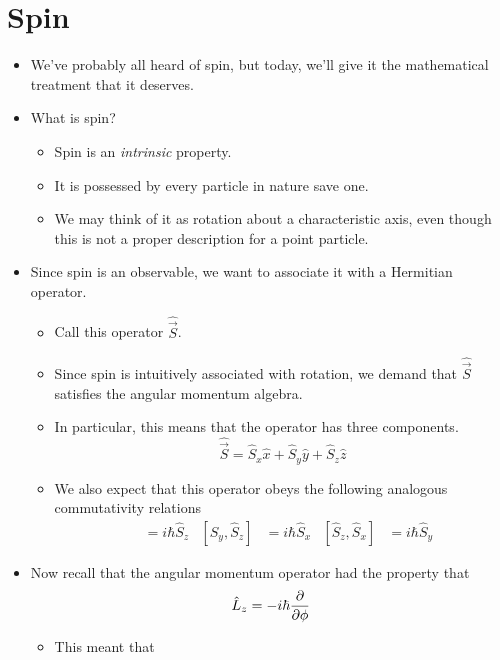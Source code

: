 \documentclass[../notes.tex]{subfiles}
\begin{document}
\section{Spin}
\begin{itemize}
    \item {}We've probably all heard of spin, but today, we'll give it the mathematical treatment that it deserves.
    \item What is spin?
    \begin{itemize}
        \item Spin is an \emph{intrinsic} property.
        \item It is possessed by every particle in nature save one.
        \item We may think of it as rotation about a characteristic axis, even though this is not a proper description for a point particle.
    \end{itemize}
    \item Since spin is an observable, we want to associate it with a Hermitian operator.
    \begin{itemize}
        \item Call this operator $\hat{\vec{S}}$.
        \item Since spin is intuitively associated with rotation, we demand that $\hat{\vec{S}}$ satisfies the angular momentum algebra.
        \item In particular, this means that the operator has three components.
        \begin{equation*}
            \hat{\vec{S}} = \hat{S}_x\hat{x}+\hat{S}_y\hat{y}+\hat{S}_z\hat{z}
        \end{equation*}
        \item We also expect that this operator obeys the following analogous commutativity relations
        \begin{align*}
            [\hat{S}_x,\hat{S}_y] &= i\hbar\hat{S}_z&
            [\hat{S}_y,\hat{S}_z] &= i\hbar\hat{S}_x&
            [\hat{S}_z,\hat{S}_x] &= i\hbar\hat{S}_y
        \end{align*}
    \end{itemize}
    \item Now recall that the angular momentum operator had the property that
    \begin{equation*}
        \hat{L}_z = -i\hbar\pdv{\phi}
    \end{equation*}
    \begin{itemize}
        \item This meant that

\end{itemize}
\end{itemize}
\end{document}

